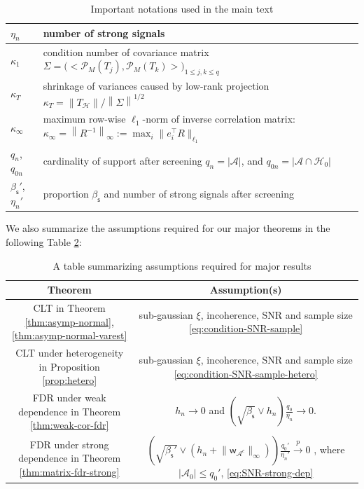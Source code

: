 \documentclass[12pt]{article}
\newcommand{\abs}[1]{\left\lvert#1\right\rvert}
\newcommand{\norm}[1]{\left\lVert#1\right\rVert}
\newcommand{\cA}{\mathcal{A}}
\newcommand{\cH}{\mathcal{H}}
\newcommand{\cP}{\mathcal{P}}
\def\sfw{\mathsf{w}}
\def\calA{{\mathcal A}}
\def\calH{{\mathcal H}}
\def\calP{{\mathcal P}}
\theoremstyle{plain}
\begin{document}
\begin{table}[htbp]
\begin{tabular}{|l|l|}
    \hline
    $\eta_n$ &  number of strong signals \\
    \hline
    $\kappa_1$ & condition number of covariance matrix $\Sigma=\big(\big<\calP_M(T_j), \calP_M(T_k)\big>\big)_{1\leq j,k\leq q}$ \\
    \hline
    $\kappa_T$ & shrinkage of variances caused by low-rank projection $\kappa_T = \norm{T_{\cH} }/\norm{\Sigma}^{1/2}$ \\
    \hline
    $\kappa_\infty$ & maximum row-wise $\ell_1$-norm of inverse correlation matrix: $\kappa_\infty=\norm{R^{-1}}_\infty:=\max_{i}\|e_i^{\top}R\|_{\ell_1}$ \\
    \hline
    $q_n$, $q_{0n}$ & cardinality of support after screening $q_n=\abs{\cA}$, and  $q_{0n}=\abs{\cA\cap \cH_0 }$ \\
    \hline
    $\beta_{\mathsf{s} }'$,  $\eta_n'$&  proportion $\beta_{\mathsf{s} }$ and number of strong signals after screening\\
    
     
  \hline \hline
	\end{tabular}
	\caption{Important notations used in the main text
 }
	\label{tab:tab-notations}
\end{table}

We also summarize the assumptions required for our major theorems in the following Table \ref{tab:table-assumption}:
\begin{table}[]
    \centering
    \begin{tabular}{|c|c|}
           \hline
       Theorem  & Assumption(s)  \\
       \hline
       CLT in Theorem \ref{thm:asymp-normal}, \ref{thm:asymp-normal-varest}   & sub-gaussian $\xi$, incoherence, SNR and sample size  \eqref{eq:condition-SNR-sample} \\
       \hline
       CLT under heterogeneity in Proposition \ref{prop:hetero} & sub-gaussian $\xi$, incoherence, SNR and sample size   \eqref{eq:condition-SNR-sample-hetero}
 \\
\hline
     FDR under weak dependence in Theorem \ref{thm:weak-cor-fdr}
   &  $h_n\to 0$ and
$\left(\sqrt{\beta_{\mathsf{s}}} \vee  h_n \right)  \frac{q_0}{\eta_n}   \to 0$. \\
       \hline
       FDR under strong dependence in Theorem \ref{thm:matrix-fdr-strong} & 
       $
\left(\sqrt{\beta_{\mathsf{s}}'} \vee  \left( h_n +\big\|\sfw_{\calA^c}\big\|_{\infty}\right)\right)  \frac{q_0'}{\eta_n'}   \overset{p}{\rightarrow} 0$
, where $\abs{\calA_0}\le q_{0}'$, \eqref{eq:SNR-strong-dep}
\\
\hline
 
    \end{tabular}
    \caption{A table summarizing assumptions required for major results}
    \label{tab:table-assumption}
\end{table}
\end{document}
